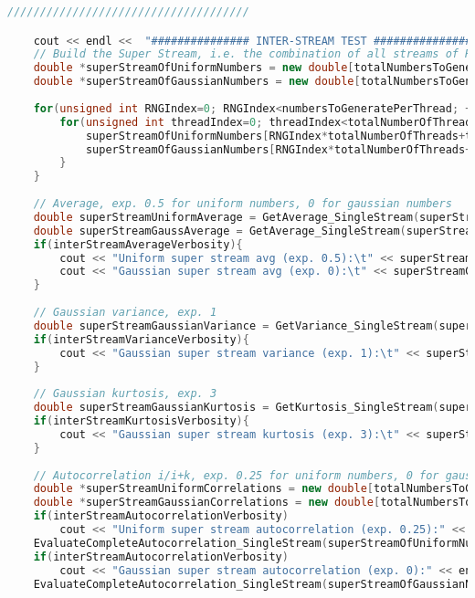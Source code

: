 \begin{lstlisting}[language=C++, caption={\texttt{libraries/CoreLibraries/RandomGenerator/CorrelationTest.cu}}]
/////////////////////////////////////

	cout << endl <<  "############### INTER-STREAM TEST ###############" << endl;
	// Build the Super Stream, i.e. the combination of all streams of RNGs
	double *superStreamOfUniformNumbers = new double[totalNumbersToGenerate];
	double *superStreamOfGaussianNumbers = new double[totalNumbersToGenerate];
	
	for(unsigned int RNGIndex=0; RNGIndex<numbersToGeneratePerThread; ++RNGIndex){
		for(unsigned int threadIndex=0; threadIndex<totalNumberOfThreads; ++threadIndex){
			superStreamOfUniformNumbers[RNGIndex*totalNumberOfThreads+threadIndex] = uniformNumbers[threadIndex][RNGIndex];
			superStreamOfGaussianNumbers[RNGIndex*totalNumberOfThreads+threadIndex] = gaussianNumbers[threadIndex][RNGIndex];
		}
	}
	
	// Average, exp. 0.5 for uniform numbers, 0 for gaussian numbers
	double superStreamUniformAverage = GetAverage_SingleStream(superStreamOfUniformNumbers, totalNumbersToGenerate);
	double superStreamGaussAverage = GetAverage_SingleStream(superStreamOfGaussianNumbers, totalNumbersToGenerate);
	if(interStreamAverageVerbosity){
		cout << "Uniform super stream avg (exp. 0.5):\t" << superStreamUniformAverage << endl;
		cout << "Gaussian super stream avg (exp. 0):\t" << superStreamGaussAverage << endl;
	}
	
	// Gaussian variance, exp. 1
	double superStreamGaussianVariance = GetVariance_SingleStream(superStreamOfGaussianNumbers, superStreamGaussAverage, totalNumbersToGenerate);
	if(interStreamVarianceVerbosity){
		cout << "Gaussian super stream variance (exp. 1):\t" << superStreamGaussianVariance << endl;
	}
	
	// Gaussian kurtosis, exp. 3
	double superStreamGaussianKurtosis = GetKurtosis_SingleStream(superStreamOfGaussianNumbers, superStreamGaussAverage, superStreamGaussianVariance, totalNumbersToGenerate);
	if(interStreamKurtosisVerbosity){
		cout << "Gaussian super stream kurtosis (exp. 3):\t" << superStreamGaussianKurtosis << endl;
	}
	
	// Autocorrelation i/i+k, exp. 0.25 for uniform numbers, 0 for gaussian numbers
	double *superStreamUniformCorrelations = new double[totalNumbersToGenerate-2];
	double *superStreamGaussianCorrelations = new double[totalNumbersToGenerate-2];
	if(interStreamAutocorrelationVerbosity)
		cout << "Uniform super stream autocorrelation (exp. 0.25):" << endl;
	EvaluateCompleteAutocorrelation_SingleStream(superStreamOfUniformNumbers, superStreamUniformCorrelations, totalNumbersToGenerate, interStreamAutocorrelationVerbosity);
	if(interStreamAutocorrelationVerbosity)
		cout << "Gaussian super stream autocorrelation (exp. 0):" << endl;
	EvaluateCompleteAutocorrelation_SingleStream(superStreamOfGaussianNumbers, superStreamGaussianCorrelations, totalNumbersToGenerate, interStreamAutocorrelationVerbosity);


\end{lstlisting}
